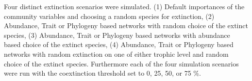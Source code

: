 \documentclass[12pt,a4paper]{article}
\begin{document}
			
 Four distinct extinction scenarios were simulated. (1) Default importances of the community variables and choosing a random species for extinction, (2) Abundance, Trait or Phylogeny based networks with random choice of the extinct species, (3) Abundance, Trait or Phylogeny based networks with abundance based choice of the extinct species, (4) Abundance, Trait or Phylogeny based networks with random extinction on one of either trophic level and random choice of the extinct species.
 Furthermore each of the four simulation scenarios were run with the coextinction threshold set to 0, 25, 50, or 75 \%. 
 
\end{document}
